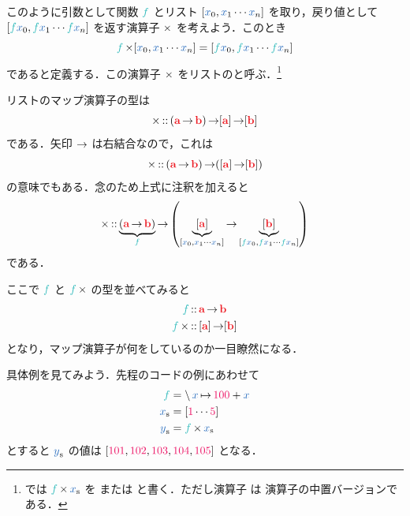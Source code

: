 \documentclass[a5paper,twoside,fleqn,draft]{jsbook}
\begin{document}
このように引数として関数 $\hFunc{f}$ とリスト $\hListWith{\hVar{x}_0,\hVar{x}_1\dotsb \hVar{x}_n}$ を取り，戻り値として $\hListWith{\hFunc{f}\hVar{x}_0,\hFunc{f}\hVar{x}_1\dotsb \hFunc{f}\hVar{x}_n}$ を返す演算子 $\operatorname{\times}$ を考えよう．このとき
\begin{equation}
  \hFunc{f}\hMap\hListWith{\hVar{x}_0,\hVar{x}_1\dotsb \hVar{x}_n}
  =\hListWith{\hFunc{f}\hVar{x}_0,\hFunc{f}\hVar{x}_1\dotsb \hFunc{f}\hVar{x}_n}
\end{equation}
であると定義する．この演算子 $\operatorname{\times}$ をリストのと呼ぶ．\footnote{\haskell では $\hFunc{f}\hMap\hListVar{x}$ を または  と書く．ただし演算子 \code{<\$>} は  演算子の中置バージョンである．}

リストのマップ演算子の型は
\begin{equation}
  \hMap
  \hIsTypeOf{}(\hTypeName{a}\hFunctionArrow\hTypeName{b})\hFunctionArrow\hListConstruct{\hTypeName{a}}\hFunctionArrow[\hTypeName{b}]
\end{equation}
である．矢印 $\operatorname{\rightarrow}$ は右結合なので，これは
\begin{equation}
  \hMap
  \hIsTypeOf{}(\hTypeName{a}\hFunctionArrow\hTypeName{b})\hFunctionArrow(\hListConstruct{\hTypeName{a}}\hFunctionArrow[\hTypeName{b}])
\end{equation}
の意味でもある．念のため上式に注釈を加えると
\begin{equation}
  \hMap
  \hIsTypeOf\underbrace{\left(\hTypeName{a}\hFunctionArrow\hTypeName{b}\right)}_{\hFunc{f}}
  \hFunctionArrow\left(\underbrace{\hListConstruct{\hTypeName{a}}}_{[\hVar{x}_0,\hVar{x}_1\dotsb \hVar{x}_n]}
  \hFunctionArrow\underbrace{[\hTypeName{b}]}_{[\hFunc{f}\hVar{x}_0,\hFunc{f}\hVar{x}_1\dotsb \hFunc{f}\hVar{x}_n]}\right)
\end{equation}
である．

ここで $\hFunc{f}$ と $\hFunc{f}\hMap$ の型を並べてみると
\begin{align}
  \hFunc{f}
  &\hIsTypeOf\hTypeName{a}\hFunctionArrow\hTypeName{b}\\
  \hFunc{f}\hMap
  &\hIsTypeOf{}\hListConstruct{\hTypeName{a}}\hFunctionArrow[\hTypeName{b}]
\end{align}
となり，マップ演算子が何をしているのか一目瞭然になる．


具体例を見てみよう．先程の\python コードの例にあわせて
\begin{align}
  \hFunc{f}
  &=\mLambda\hVar{x}\mLambdaArrow\hConstant{100}+\hVar{x}\\
  \hListVar{x}
  &=[\hConstant{1}\dotsb\hConstant{5}]\\
  \hListVar{y}
  &=\hFunc{f}\hMap\hListVar{x}
\end{align}
とすると $\hListVar{y}$ の値は $[\hConstant{101},\hConstant{102},\hConstant{103},\hConstant{104},\hConstant{105}]$ となる．
\end{document}

